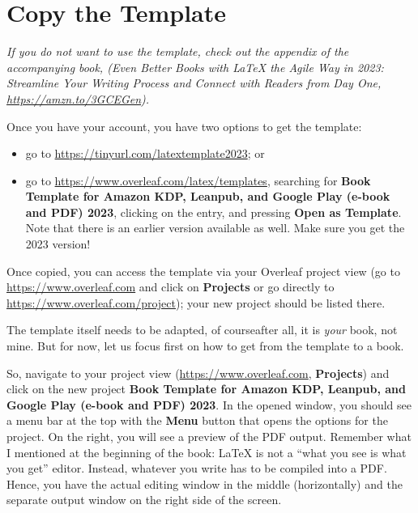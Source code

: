 \section{Copy the Template}\label{copytemplate:sec}

\textit{If you do not want to use the template, check out the appendix of the accompanying book, (\textit{Even Better Books with LaTeX the Agile Way in 2023: Streamline Your Writing Process and Connect with Readers from Day One}, \url{https://amzn.to/3GCEGen}).}


Once you have your account, you have two options to get the template:

\begin{itemize}
\item go to \url{https://tinyurl.com/latextemplate2023}; or 
\item go to \url{https://www.overleaf.com/latex/templates}, searching for \textbf{Book Template for Amazon KDP, Leanpub, and Google Play (e-book and PDF) 2023}, clicking on the entry, and pressing \textbf{Open as Template}. Note that there is an earlier version available as well. Make sure you get the 2023 version!
\end{itemize}

Once copied, you can access the template via your Overleaf project view (go to \url{https://www.overleaf.com} and click on \textbf{Projects} or go directly to \url{https://www.overleaf.com/project}); your new project should be listed there. 

The template itself needs to be adapted, of course\emdash{}after all, it is \textit{your} book, not mine. But for now, let us focus first on how to get from the template to a book. 

So, navigate to your project view (\url{https://www.overleaf.com}, \textbf{Projects}) and click on the new project \textbf{Book Template for Amazon KDP, Leanpub, and Google Play (e-book and PDF) 2023}. In the opened window, you should see a menu bar at the top with the \textbf{Menu} button that opens the options for the project. On the right, you will see a preview of the PDF output. Remember what I mentioned at the beginning of the book: LaTeX is not a ``what you see is what you get'' editor. Instead, whatever you write has to be compiled into a PDF. Hence, you have the actual editing window in the middle (horizontally) and the separate output window on the right side of the screen.


